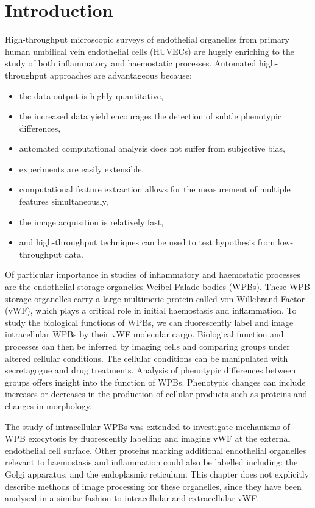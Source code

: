 \section{Introduction}
\label{endothelial_morphometry:introduction}
High-throughput microscopic surveys of endothelial organelles from primary human umbilical vein endothelial cells (HUVECs) are hugely enriching to the study of both inflammatory and haemostatic processes. Automated high-throughput approaches are advantageous because:
\begin{itemize}\setlength\itemsep{0pt}
	\item the data output is highly quantitative,
	\item the increased data yield encourages the detection of subtle phenotypic differences,
	\item automated computational analysis does not suffer from subjective bias,
	\item experiments are easily extensible,
	\item computational feature extraction allows for the measurement of multiple features simultaneously,
	\item the image acquisition is relatively fast,
	\item and high-throughput techniques can be used to test hypothesis from low-throughput data.
\end{itemize}

Of particular importance in studies of inflammatory and haemostatic processes are the endothelial storage organelles Weibel-Palade bodies (WPBs). These WPB storage organelles carry a large multimeric protein called von Willebrand Factor (vWF), which plays a critical role in initial haemostasis and inflammation. To study the biological functions of WPBs, we can fluorescently label and image intracellular WPBs by their vWF molecular cargo. Biological function and processes can then be inferred by imaging cells and comparing groups under altered cellular conditions. The cellular conditions can be manipulated with secretagogue and drug treatments. Analysis of phenotypic differences between groups offers insight into the function of WPBs. Phenotypic changes can include increases or decreases in the production of cellular products such as proteins and changes in morphology.

The study of intracellular WPBs was extended to investigate mechanisms of WPB exocytosis by fluorescently labelling and imaging vWF at the external endothelial cell surface. Other proteins marking additional endothelial organelles relevant to haemostasis and inflammation could also be labelled including: the Golgi apparatus, and the endoplasmic reticulum. This chapter does not explicitly describe methods of image processing for these organelles, since they have been analysed in a similar fashion to intracellular and extracellular vWF.

